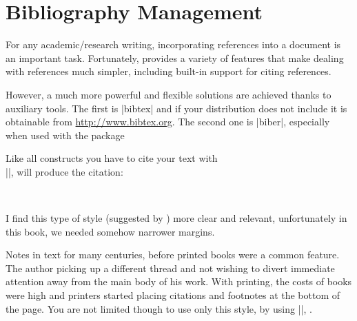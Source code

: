 \chapter{Bibliography Management} 


\begin{refsection}
 


For any academic/research writing, incorporating references into a document is an important task. Fortunately, \latex provides  a variety of features that make dealing with references much simpler, including built-in support for citing references. 

However, a much more powerful and flexible solutions are achieved thanks to auxiliary tools. The first is |bibtex| and if your \latex  distribution does not include it is obtainable from \url{http://www.bibtex.org}. The second one is |biber|, especially when used with the package 


Like all \latexe constructs you have to cite your text with\\  |\cite{Abrahams2003}|, will produce the citation:

\begin{scriptexample}[]{}
\\
\cite{booktabs}
\end{scriptexample}
 
 
I find this type of style (suggested by \cite{Tufte1997}) more clear and relevant, unfortunately in this book, we needed somehow narrower margins.
\marginnote{\fullcite}

Notes in text for many centuries, before printed books were a common feature. The author picking up a different thread and not wishing to divert immediate attention away from the main body of his work. With printing, the costs of books were high and printers started placing citations and footnotes at the bottom of the page. You are not limited though to use only this style, by using |\cite{Bringhurst2005}|, \cite{Bringhurst2005}.


\end{refsection}
